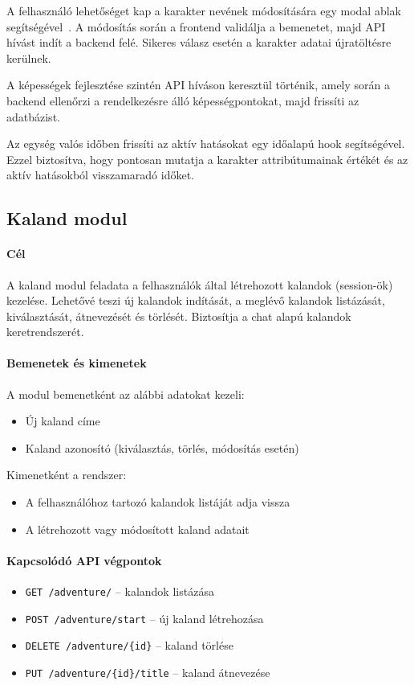 \documentclass[
]{thesis-ekf}
\theoremstyle{definition}
\theoremstyle{remark}
\begin{document}
A felhasználó lehetőséget kap a karakter nevének módosítására egy modal ablak segítségével~\cite{react_modal}. A módosítás során a frontend validálja a bemenetet, majd API hívást indít a backend felé. Sikeres válasz esetén a karakter adatai újratöltésre kerülnek.

A képességek fejlesztése szintén API híváson keresztül történik, amely során a backend ellenőrzi a rendelkezésre álló képességpontokat, majd frissíti az adatbázist.

Az egység valós időben frissíti az aktív hatásokat egy időalapú hook segítségével. Ezzel biztosítva, hogy pontosan mutatja a karakter attribútumainak értékét és az aktív hatásokból visszamaradó időket.

\subsection{Kaland modul}

\paragraph{Cél}

A kaland modul feladata a felhasználók által létrehozott kalandok (session-ök) kezelése. Lehetővé teszi új kalandok indítását, a meglévő kalandok listázását, kiválasztását, átnevezését és törlését. Biztosítja a chat alapú kalandok keretrendszerét.

\paragraph{Bemenetek és kimenetek}

A modul bemenetként az alábbi adatokat kezeli:
\begin{itemize}
    \item Új kaland címe
    \item Kaland azonosító (kiválasztás, törlés, módosítás esetén)
\end{itemize}

Kimenetként a rendszer:
\begin{itemize}
    \item A felhasználóhoz tartozó kalandok listáját adja vissza
    \item A létrehozott vagy módosított kaland adatait
\end{itemize}

\paragraph{Kapcsolódó API végpontok}
\begin{itemize}
    \item \texttt{GET /adventure/} – kalandok listázása
    \item \texttt{POST /adventure/start} – új kaland létrehozása
    \item \texttt{DELETE /adventure/\{id\}} – kaland törlése
    \item \texttt{PUT /adventure/\{id\}/title} – kaland átnevezése
\end{itemize}
\end{document}
